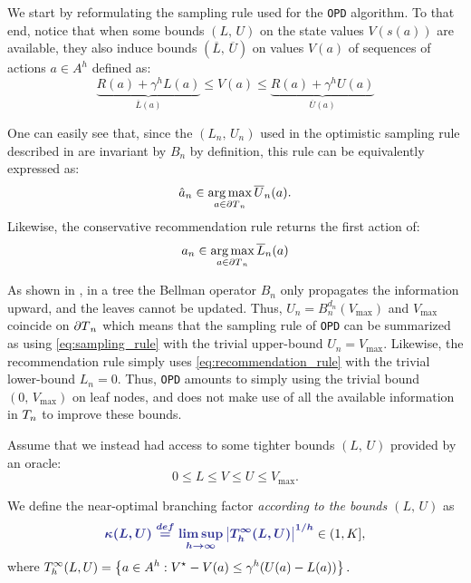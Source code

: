 \documentclass[runningheads]{llncs}
\begin{document}
We start by reformulating the sampling rule used for the \texttt{OPD} algorithm. To that end, notice that when some bounds $(L,\,U)$ on the state values $V(s(a))$ are available, they also induce bounds $(\overline{L},\, \overline{U})$ on values $V(a)$ of sequences of actions $a\in A^h$ defined as:
\begin{equation*}
\underbrace{R(a) + \gamma^{h} L(a)}_{\overline{L}(a)} \leq V(a) \leq \underbrace{R(a) + \gamma^{h} U(a)}_{\overline{U}(a)}
\end{equation*}


One can easily see that, since the $(L_n,\,U_n)$ used in the optimistic sampling rule described in  are invariant by $B_n$ by definition, this rule can be equivalently expressed as:
\begin{equation}
\label{eq:sampling_rule}
\hat{a}_n \in \operatorname*{arg\,max}_{a\in{\partial T}_n} \overline{U}_n(a).
\end{equation}
Likewise, the conservative recommendation rule returns the first action of:
\begin{equation}
\label{eq:recommendation_rule}
a_n \in \operatorname*{arg\,max}_{a\in{\partial T}_n} \overline{L}_n(a)
\end{equation}


As shown in , in a tree the Bellman operator $B_n$ only propagates the information upward, and the leaves cannot be updated. Thus, $U_n = B_n^{d_n}(V_{\max})$ and $V_{\max}$ coincide on ${\partial T}_n$ which means that the sampling rule of \texttt{OPD} can be summarized as using \eqref{eq:sampling_rule} with the trivial upper-bound $U_n = V_{\max}$.
Likewise, the recommendation rule simply uses \eqref{eq:recommendation_rule} with the trivial lower-bound $L_n = 0$. Thus, \texttt{OPD} amounts to simply using the trivial bound $(0,\, V_{\max})$ on leaf nodes, and does not make use of all the available information in $T_n$ to improve these bounds.

Assume that we instead had access to some tighter bounds $(L,\,U)$ provided by an oracle: $$0\leq L\leq V\leq U\leq V_{\max}.$$
\begin{definition}
We define the near-optimal branching factor \emph{according to the bounds $(L,\,U)$} as 
\begin{equation}
\hlbb{\kappa(L,U) \eqdef \limsup_{h\rightarrow\infty} \left|\Tau_h^\infty(L,U)\right|^{1/h}}\in(1, K], 
\end{equation}
where
$ \displaystyle
     {T_h^\infty(L,U)}=\left\{a\in A^h: V^\star - V(a)\leq \gamma^{h}(U(a)-L(a))\right\}.
$
\end{definition}
\end{document}
